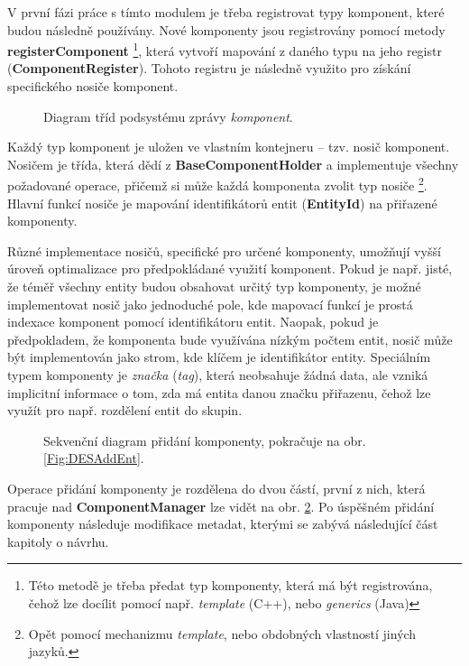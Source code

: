 V první fázi práce s tímto modulem je třeba registrovat typy komponent, které budou následně používány. Nové komponenty jsou registrovány pomocí metody \textbf{registerComponent} \footnote{Této metodě je třeba předat typ komponenty, která má být registrována, čehož lze docílit pomocí např. \emph{template} (C++), nebo \emph{generics} (Java)}, která vytvoří mapování z daného typu na jeho registr (\textbf{ComponentRegister}). Tohoto registru je následně využito pro získání specifického nosiče komponent.

\begin{figure}[H]
	\caption{Diagram tříd podsystému zprávy \emph{komponent}.}
	\label{Fig:DESCompDiag}
\end{figure}

Každý typ komponent je uložen ve vlastním kontejneru -- tzv. nosič komponent. Nosičem je třída, která dědí z \textbf{BaseComponentHolder} a implementuje všechny požadované operace, přičemž si může každá komponenta zvolit typ nosiče \footnote{Opět pomocí mechanizmu \emph{template}, nebo obdobných vlastností jiných jazyků.}. Hlavní funkcí nosiče je mapování identifikátorů entit (\textbf{EntityId}) na přiřazené komponenty. 

Různé implementace nosičů, specifické pro určené komponenty, umožňují vyšší úroveň optimalizace pro předpokládané využití komponent. Pokud je např. jisté, že téměř všechny entity budou obsahovat určitý typ komponenty, je možné implementovat nosič jako jednoduché pole, kde mapovací funkcí je prostá indexace komponent pomocí identifikátoru entit. Naopak, pokud je předpokladem, že komponenta bude využívána nízkým počtem entit, nosič může být implementován jako strom, kde klíčem je identifikátor entity. Speciálním typem komponenty je \emph{značka} (\emph{tag}), která neobsahuje žádná data, ale vzniká implicitní informace o tom, zda má entita danou značku přiřazenu, čehož lze využít pro např. rozdělení entit do skupin.

\begin{figure}[H]
	\caption{Sekvenční diagram přidání komponenty, pokračuje na obr. \ref{Fig:DESAddEnt}.}
	\label{Fig:DESAddComp}
\end{figure}

Operace přidání komponenty je rozdělena do dvou částí, první z nich, která pracuje nad \textbf{ComponentManager} lze vidět na obr. \ref{Fig:DESAddComp}. Po úspěšném přidání komponenty následuje modifikace metadat, kterými se zabývá následující část kapitoly o návrhu.

